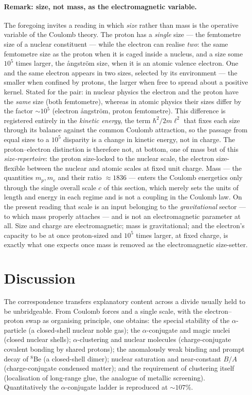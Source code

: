 \documentclass[11pt]{article}
\begin{document}
\paragraph{Remark: size, not mass, as the electromagnetic variable.}
The foregoing invites a reading in which \emph{size} rather than mass is the operative variable of the
Coulomb theory. The proton has a \emph{single} size --- the
femtometre size of a nuclear constituent --- while the electron can realise \emph{two}: the same
femtometre size as the proton when it is caged inside a nucleus, and a size some $10^5$ times larger,
the {\aa}ngstr\"om size, when it is an atomic valence electron. One and the same electron appears in
two sizes, selected by its environment --- the smaller when confined by protons, the larger when free
to spread about a positive kernel. Stated for the pair: in nuclear physics the electron and the proton
have the \emph{same} size (both femtometre), whereas in atomic physics their sizes differ by the factor
$\sim10^5$ (electron {\aa}ngstr\"om, proton femtometre). This difference is registered entirely in the
\emph{kinetic energy}, the term $\hbar^2/2m\ell^2$ that fixes each size through its balance against the
common Coulomb attraction, so the passage from equal sizes to a $10^5$ disparity is a change in kinetic
energy, not in charge. The proton--electron distinction is therefore not, at bottom, one
of mass but of this \emph{size-repertoire}: the proton size-locked to the nuclear scale, the electron
size-flexible between the nuclear and atomic scales at fixed unit charge. Mass --- the quantities
$m_p,m_e$ and their ratio $\approx1836$ --- enters the Coulomb energetics only through the single
overall scale $c$ of this section, which merely sets the units of length and energy in each regime and
is not a coupling in the Coulomb law. On the present reading that scale is an input belonging to the
\emph{gravitational} sector --- to which mass properly attaches --- and is not an electromagnetic
parameter at all. Size and charge are electromagnetic; mass is gravitational; and the electron's
capacity to be at once proton-sized and $10^5$ times larger, at fixed charge, is exactly what one
expects once mass is removed as the electromagnetic size-setter.

\section{Discussion}

The correspondence transfers explanatory content across a divide usually held to be unbridgeable. From
Coulomb forces and a single scale, with the electron--proton swap as organising principle, one obtains:
the special stability of the $\alpha$-particle (a closed-shell nuclear noble gas); the
$\alpha$-conjugate and magic nuclei (closed nuclear shells); $\alpha$-clustering and nuclear molecules
(charge-conjugate covalent bonding by shared protons); the anomalously weak binding and prompt decay of
$^8$Be (a closed-shell dimer); nuclear saturation and near-constant $B/A$ (charge-conjugate condensed
matter); and the requirement of clustering itself (localisation of long-range glue, the analogue of
metallic screening). Quantitatively the $\alpha$-conjugate ladder is reproduced at $\sim\!107\%$.
\end{document}
